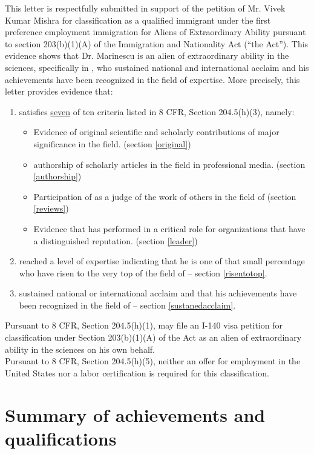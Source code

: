 \documentclass[11pt]{article}
\begin{document}
This letter is respectfully submitted in support of the petition of Mr. Vivek Kumar Mishra for classification as a qualified immigrant under the first preference employment immigration for Aliens of Extraordinary Ability pursuant to section 203(b)(1)(A) of the Immigration and Nationality Act (“the Act”). This evidence shows that Dr. Marinescu is an alien of extraordinary ability in the sciences, specifically in \underline{\fie{}}, who sustained national and international acclaim and his achievements have been recognized in the field of expertise. More precisely, this letter provides evidence that:
\begin{enumerate}
 \item \dr satisfies \underline{seven} of ten criteria listed in 8
CFR, Section 204.5(h)(3), namely:
\begin{itemize}
 \item Evidence of \drs original scientific and scholarly contributions of major
significance in the field. (section \ref{original})
 \item \drs authorship of scholarly articles in the field in professional media. (section \ref{authorship})
 \item Participation of \dr as a judge of the work of others in the field of
\fie{} (section \ref{reviews})
 \item Evidence that \dr has performed in a critical role for organizations that have a
distinguished reputation. (section \ref{leader})
\end{itemize}
 \item \dr reached a level of expertise indicating that he is one of that small percentage who have risen to the very top of the field of \fie{} -- section \ref{risentotop}.
 \item \dr sustained national or international acclaim and that his achievements have been recognized in the field of \fie{} -- section \ref{sustanedacclaim}.
\end{enumerate}


Pursuant to 8 CFR, Section 204.5(h)(1), \dr may file an I-140 visa petition for classification under Section 203(b)(1)(A) of the Act as an alien of extraordinary ability in the sciences on his own behalf.\\

Pursuant to 8 CFR, Section 204.5(h)(5), neither an offer for employment in the United States nor a labor certification is required for this classification.



\section{Summary of \drs achievements and qualifications}
\end{document}
